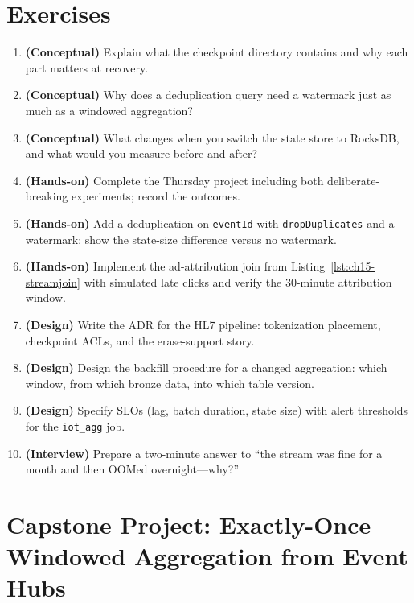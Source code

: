 \section{Exercises}
\begin{enumerate}
    \item \textbf{(Conceptual)} Explain what the checkpoint directory contains and why each part matters at recovery.
    \item \textbf{(Conceptual)} Why does a deduplication query need a watermark just as much as a windowed aggregation?
    \item \textbf{(Conceptual)} What changes when you switch the state store to RocksDB, and what would you measure before and after?
    \item \textbf{(Hands-on)} Complete the Thursday project including both deliberate-breaking experiments; record the outcomes.
    \item \textbf{(Hands-on)} Add a deduplication on \texttt{eventId} with \texttt{dropDuplicates} and a watermark; show the state-size difference versus no watermark.
    \item \textbf{(Hands-on)} Implement the ad-attribution join from Listing~\ref{lst:ch15-streamjoin} with simulated late clicks and verify the 30-minute attribution window.
    \item \textbf{(Design)} Write the ADR for the HL7 pipeline: tokenization placement, checkpoint ACLs, and the erase-support story.
    \item \textbf{(Design)} Design the backfill procedure for a changed aggregation: which window, from which bronze data, into which table version.
    \item \textbf{(Design)} Specify SLOs (lag, batch duration, state size) with alert thresholds for the \texttt{iot\_agg} job.
    \item \textbf{(Interview)} Prepare a two-minute answer to ``the stream was fine for a month and then OOMed overnight---why?''
\end{enumerate}

\section{Capstone Project: Exactly-Once Windowed Aggregation from Event Hubs}\label{sec:ch15-capstone}

